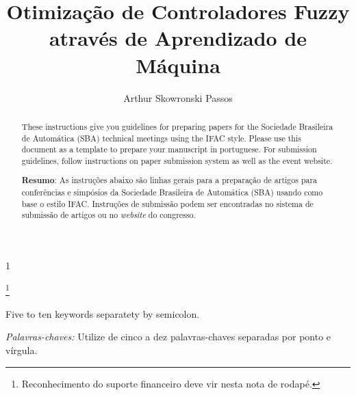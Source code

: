 \documentclass[a4paper]{ifacconf}
\def\portugues{1}
\def\portugues{0}
\begin{document}
	
	
\if\portugues1

% 
	
\begin{frontmatter}

\title{Otimização de Controladores Fuzzy através de Aprendizado de Máquina} 

\thanks[footnoteinfo]{Reconhecimento do suporte financeiro deve vir nesta nota de rodapé.}


\author[First]{Arthur Skowronski Passos} 

\address[First]{Instituto Federal de Educação, Ciência e Tecnologia de Goiás, Câmpus Goiânia, GO (e-mail: arthur.passos@estudantes.ifg.edu.br).}


\renewcommand{\abstractname}{{\bf Abstract:~}}
\begin{abstract}                %
These instructions give you guidelines for preparing papers for the Sociedade Brasileira de Automática (SBA) technical meetings using the IFAC style. Please use this document as a template to prepare your manuscript in portuguese. For submission guidelines, follow instructions on paper submission system as well as the event website.

\vskip 1mm%
{\noindent \bf Resumo}:  As instruções abaixo são linhas gerais para a preparação de artigos para conferências e simpósios da Sociedade Brasileira de Automática (SBA) usando como base o estilo IFAC. Instruções de submissão podem ser encontradas no sistema de submissão de artigos ou no {\em website} do congresso.
\end{abstract}



\begin{keyword}
Five to ten keywords separatety by semicolon. 

\vskip 1mm%
{\noindent\it Palavras-chaves:} Utilize de cinco a dez palavras-chaves separadas por ponto e vírgula.
\end{keyword}




\end{frontmatter}
\end{document}
